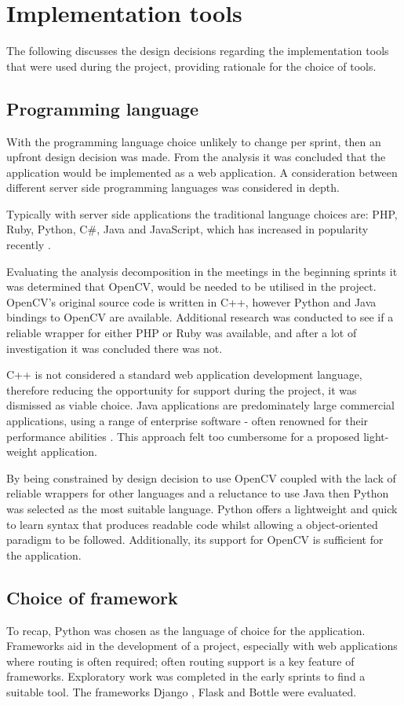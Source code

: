 \section{Implementation tools}
The following discusses the design decisions regarding the implementation tools that were used during the project, providing rationale for the choice of tools.
\subsection{Programming language}
With the programming language choice unlikely to change per sprint, then an upfront design decision was made. From the analysis it was concluded that the application would be implemented as a web application.  A consideration between different server side programming languages was considered in depth.

Typically with server side applications the traditional language choices are: PHP, Ruby, Python, C#, Java and JavaScript, which has increased in popularity recently \cite{citeulike:14018462}.

Evaluating the analysis decomposition in the meetings in the beginning sprints it was determined that OpenCV, would be needed to be utilised in the project. OpenCV's original source code is written in C++, however Python and Java bindings to OpenCV are available. Additional research was conducted to see if a reliable wrapper for either PHP or Ruby was available, and after a lot of investigation it was concluded there was not.

C++ is not considered a standard web application development language, therefore reducing the opportunity for support during the project, it was dismissed as viable choice. Java applications are predominately large commercial applications, using a range of enterprise software - often renowned for their performance abilities \cite{citeulike:14019744}. This approach felt too cumbersome for a proposed light-weight application.

By being constrained by design decision to use OpenCV coupled with the lack of reliable wrappers for other languages and a reluctance to use Java then Python was selected as the most suitable language. Python offers a lightweight and quick to learn syntax that produces readable code whilst allowing a object-oriented paradigm to be followed. Additionally, its support for OpenCV is sufficient for the application.


\subsection{Choice of framework}
To recap, Python was chosen as the language of choice for the application. Frameworks aid in the development of a project, especially with web applications where routing is often required; often routing support is a key feature of frameworks. Exploratory work was completed in the early sprints to find a suitable tool. The frameworks Django \cite{citeulike:14019784}, Flask \cite{citeulike:13160396} and Bottle \cite{citeulike:14019792} were evaluated.

